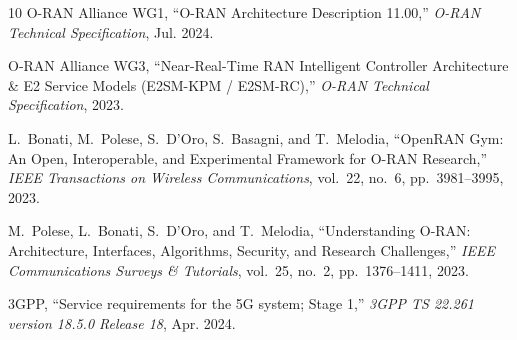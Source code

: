 \documentclass[10pt,journal,compsoc,a4paper]{IEEEtran}
\begin{document}
\begin{thebibliography}{10}
O-RAN Alliance WG1, ``O-RAN Architecture Description 11.00,'' \emph{O-RAN Technical Specification}, Jul. 2024.

O-RAN Alliance WG3, ``Near-Real-Time RAN Intelligent Controller Architecture \& E2 Service Models (E2SM-KPM / E2SM-RC),'' \emph{O-RAN Technical Specification}, 2023.

L.~Bonati, M.~Polese, S.~D'Oro, S.~Basagni, and T.~Melodia, ``OpenRAN Gym: An Open, Interoperable, and Experimental Framework for O-RAN Research,'' \emph{IEEE Transactions on Wireless Communications}, vol.~22, no.~6, pp.~3981--3995, 2023.

M.~Polese, L.~Bonati, S.~D'Oro, and T.~Melodia, ``Understanding O-RAN: Architecture, Interfaces, Algorithms, Security, and Research Challenges,'' \emph{IEEE Communications Surveys \& Tutorials}, vol.~25, no.~2, pp.~1376--1411, 2023.

3GPP, ``Service requirements for the 5G system; Stage 1,'' \emph{3GPP TS 22.261 version 18.5.0 Release 18}, Apr. 2024.
\end{thebibliography}
\end{document}
